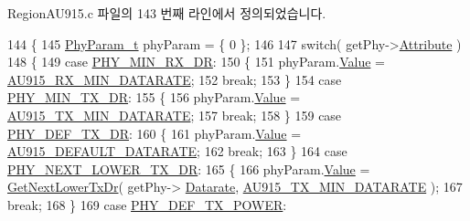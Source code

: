 Region\+A\+U915.\+c 파일의 143 번째 라인에서 정의되었습니다.


\begin{DoxyCode}
144 \{
145     \mbox{\hyperlink{unionu_phy_param}{PhyParam\_t}} phyParam = \{ 0 \};
146 
147     \textcolor{keywordflow}{switch}( getPhy->\mbox{\hyperlink{structs_get_phy_params_abdcb168ffd6913b85e2f635d7a475f2d}{Attribute}} )
148     \{
149         \textcolor{keywordflow}{case} \mbox{\hyperlink{group___r_e_g_i_o_n_gga51cbe8f5433d914fe9cf81b451de2c2da91cb5d84f937c32cd635dd7efe7a9d3a}{PHY\_MIN\_RX\_DR}}:
150         \{
151             phyParam.\mbox{\hyperlink{unionu_phy_param_a8e0dcce3428a8051614e852b8836d0d1}{Value}} = \mbox{\hyperlink{group___r_e_g_i_o_n_a_u915_ga6c3e760e2bc555e4d608ff12d14f6652}{AU915\_RX\_MIN\_DATARATE}};
152             \textcolor{keywordflow}{break};
153         \}
154         \textcolor{keywordflow}{case} \mbox{\hyperlink{group___r_e_g_i_o_n_gga51cbe8f5433d914fe9cf81b451de2c2daace3e56c88b40def8ed6a9106871e7de}{PHY\_MIN\_TX\_DR}}:
155         \{
156             phyParam.\mbox{\hyperlink{unionu_phy_param_a8e0dcce3428a8051614e852b8836d0d1}{Value}} = \mbox{\hyperlink{group___r_e_g_i_o_n_a_u915_ga3a7bb744191d2b9daaf6637d36d78422}{AU915\_TX\_MIN\_DATARATE}};
157             \textcolor{keywordflow}{break};
158         \}
159         \textcolor{keywordflow}{case} \mbox{\hyperlink{group___r_e_g_i_o_n_gga51cbe8f5433d914fe9cf81b451de2c2da70c3923333165960549162e3dcf10467}{PHY\_DEF\_TX\_DR}}:
160         \{
161             phyParam.\mbox{\hyperlink{unionu_phy_param_a8e0dcce3428a8051614e852b8836d0d1}{Value}} = \mbox{\hyperlink{group___r_e_g_i_o_n_a_u915_gaf13e696fe1ca41f523d0a52b0878c278}{AU915\_DEFAULT\_DATARATE}};
162             \textcolor{keywordflow}{break};
163         \}
164         \textcolor{keywordflow}{case} \mbox{\hyperlink{group___r_e_g_i_o_n_gga51cbe8f5433d914fe9cf81b451de2c2dac002e7e492cf30dbf9c544b062f5cc8a}{PHY\_NEXT\_LOWER\_TX\_DR}}:
165         \{
166             phyParam.\mbox{\hyperlink{unionu_phy_param_a8e0dcce3428a8051614e852b8836d0d1}{Value}} = \mbox{\hyperlink{_region_a_u915_8c_ae06574681e2f7c3f3e604878c81743aa}{GetNextLowerTxDr}}( getPhy->
      \mbox{\hyperlink{structs_get_phy_params_ae2f6080f3aa0e9485c55513ca56bb24d}{Datarate}}, \mbox{\hyperlink{group___r_e_g_i_o_n_a_u915_ga3a7bb744191d2b9daaf6637d36d78422}{AU915\_TX\_MIN\_DATARATE}} );
167             \textcolor{keywordflow}{break};
168         \}
169         \textcolor{keywordflow}{case} \mbox{\hyperlink{group___r_e_g_i_o_n_gga51cbe8f5433d914fe9cf81b451de2c2da18ae0d314f20c212f9e40207099ab1bb}{PHY\_DEF\_TX\_POWER}}:

\end{DoxyCode}
